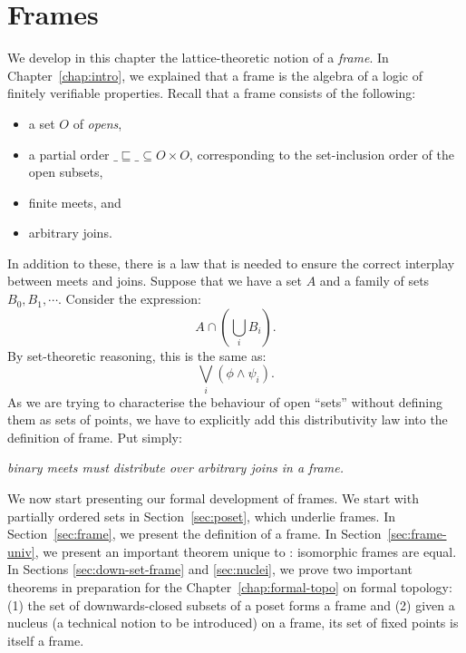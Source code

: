 \chapter{Frames}\label{chap:frames}

We develop in this chapter the lattice-theoretic notion of a \emph{frame}. In
Chapter~\ref{chap:intro}, we explained that a frame is the algebra of a logic of finitely
verifiable properties. Recall that a frame consists of the following:
\begin{itemize}
  \item a set $O$ of \emph{opens},
  \item a partial order $\_\sqsubseteq\_ \subseteq O \times O$, corresponding to the set-inclusion order of the
    open subsets,
  \item finite meets, and
  \item arbitrary joins.
\end{itemize}

In addition to these, there is a law that is needed to ensure the correct interplay
between meets and joins. Suppose that we have a set $A$ and a family of sets $B_0, B_1,
\cdots$. Consider the expression:
\begin{equation*}
  A \cap (\bigcup_i B_i).
\end{equation*}
By set-theoretic reasoning, this is the same as:
\begin{equation*}
  \bigvee_i (\phi \wedge \psi_i).
\end{equation*}
As we are trying to characterise the behaviour of open ``sets'' without defining them as
sets of points, we have to explicitly add this distributivity law into the definition of
frame. Put simply:
\begin{center}
  \emph{binary meets must distribute over arbitrary joins in a frame.}
\end{center}

We now start presenting our formal development of frames. We start with partially ordered
sets in Section~\ref{sec:poset}, which underlie frames. In Section~\ref{sec:frame}, we
present the definition of a frame. In Section~\ref{sec:frame-univ}, we present an
important theorem unique to \UF{}: isomorphic frames are equal. In Sections
\ref{sec:down-set-frame} and \ref{sec:nuclei}, we prove two important theorems in
preparation for the Chapter~\ref{chap:formal-topo} on formal topology: (1) the set of
downwards-closed subsets of a poset forms a frame and (2) given a nucleus (a technical
notion to be introduced) on a frame, its set of fixed points is itself a frame.

